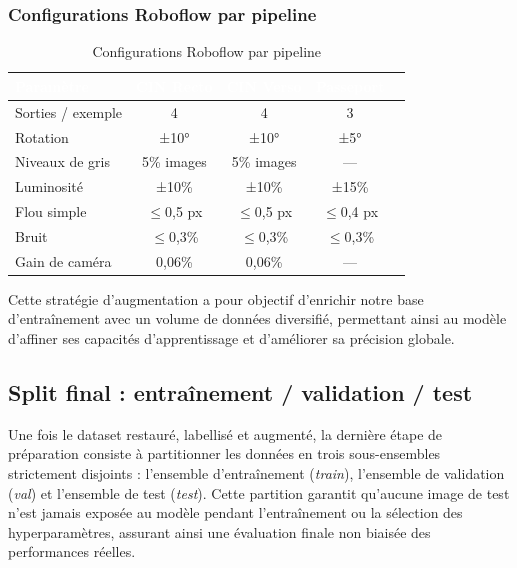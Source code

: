 \subsubsection{Configurations Roboflow par pipeline}

\begin{table}[H]
  \centering
  \small
  \begin{tabular}{|l|c|c|c|c|}
    \toprule
    \rowcolor{bleu_principal}
    \textcolor{white}{\textbf{Paramètre}} & \textcolor{white}{\textbf{CIN Recto}} & \textcolor{white}{\textbf{CIN Verso}} & \textcolor{white}{\textbf{Passeport}} \\
    \midrule
    Sorties / exemple  & 4 & 4 & 3 \\
    \midrule
    \rowcolor{gris_leger}
    Rotation  & ±10° & ±10° & ±5° \\
    \midrule
    Niveaux de gris & 5\% images & 5\% images & --- \\
    \midrule
    \rowcolor{gris_leger}
    Luminosité & ±10\% & ±10\% & ±15\% \\
    \midrule
    Flou simple & $\leq$0,5 px & $\leq$0,5 px & $\leq$0,4 px \\
    \midrule
    \rowcolor{gris_leger}
    Bruit  & $\leq$0,3\% & $\leq$0,3\% & $\leq$0,3\% \\
    \midrule
    Gain de caméra  & 0,06\% & 0,06\% & --- \\
    \midrule
  \end{tabular}
  \caption{Configurations Roboflow par pipeline}
  \label{tab:ch3-roboflow-config}
\end{table}

Cette stratégie d'augmentation a pour objectif d'enrichir notre base d'entraînement avec un volume de données diversifié, permettant ainsi au modèle d'affiner ses capacités d'apprentissage et d'améliorer sa précision globale.

\subsection{Split final : entraînement / validation / test}
\label{subsec:split-final}

Une fois le dataset restauré, labellisé et augmenté, la dernière étape de préparation consiste à partitionner les données en trois sous-ensembles strictement disjoints : l'ensemble d'entraînement (\textit{train}), l'ensemble de validation (\textit{val}) et l'ensemble de test (\textit{test}). Cette partition garantit qu'aucune image de test n'est jamais exposée au modèle pendant l'entraînement ou la sélection des hyperparamètres, assurant ainsi une évaluation finale non biaisée des performances réelles.

